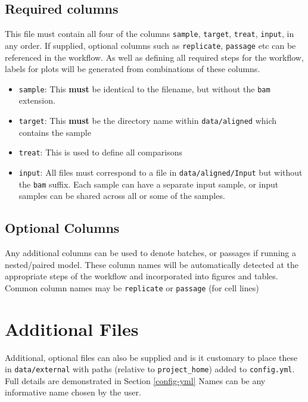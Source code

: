 \documentclass[
]{book}
\providecommand{\tightlist}{%
  \setlength{\itemsep}{0pt}\setlength{\parskip}{0pt}}
\begin{document}
\hypertarget{required-columns}{%
\subsection{Required columns}\label{required-columns}}

This file must contain all four of the columns \texttt{sample}, \texttt{target}, \texttt{treat}, \texttt{input}, in any order.
If supplied, optional columns such as \texttt{replicate}, \texttt{passage} etc can be referenced in the workflow.
As well as defining all required steps for the workflow, labels for plots will be generated from combinations of these columns.

\begin{itemize}
\tightlist
\item
  \texttt{sample}: This \textbf{must} be identical to the filename, but without the \texttt{bam} extension.
\item
  \texttt{target}: This \textbf{must} be the directory name within \texttt{data/aligned} which contains the sample
\item
  \texttt{treat}: This is used to define all comparisons
\item
  \texttt{input}: All files must correspond to a file in \texttt{data/aligned/Input} but without the \texttt{bam} suffix. Each sample can have a separate input sample, or input samples can be shared across all or some of the samples.
\end{itemize}

\hypertarget{optional-columns}{%
\subsection{Optional Columns}\label{optional-columns}}

Any additional columns can be used to denote batches, or passages if running a nested/paired model.
These column names will be automatically detected at the appropriate steps of the workflow and incorporated into figures and tables.
Common column names may be \texttt{replicate} or \texttt{passage} (for cell lines)

\hypertarget{additional-files}{%
\section{Additional Files}\label{additional-files}}

Additional, optional files can also be supplied and is it customary to place these in \texttt{data/external} with paths (relative to \texttt{project\_home}) added to \texttt{config.yml}.
Full details are demonstrated in Section \ref{config-yml}
Names can be any informative name chosen by the user.
\end{document}
